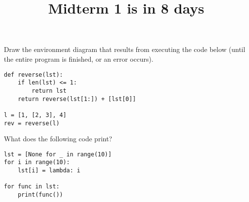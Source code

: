 \documentclass[twoside]{article}
\title{\sc Midterm 1 is in 8 days}
\begin{document}
\maketitle

\begin{enumerate}

Draw the environment diagram that results from executing the code below (until the entire program is finished, or an error occurs).
\vspace{0.1in}

\begin{lstlisting}
def reverse(lst):
    if len(lst) <= 1:
        return lst
    return reverse(lst[1:]) + [lst[0]]

l = [1, [2, 3], 4]
rev = reverse(l)
\end{lstlisting}

\newpage


What does the following code print?
\vspace{0.1in}

\begin{lstlisting}
lst = [None for _ in range(10)]
for i in range(10):
    lst[i] = lambda: i

for func in lst:
    print(func())
\end{lstlisting}

\end{enumerate}
\end{document}
